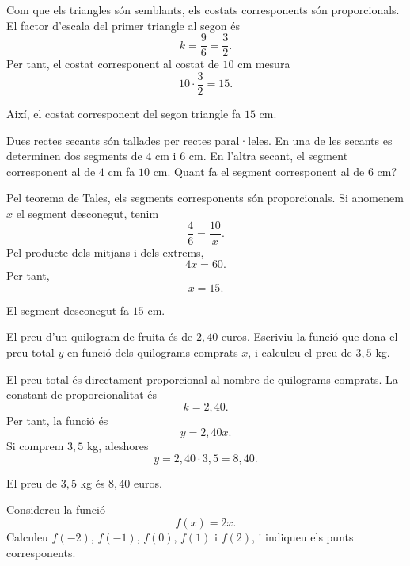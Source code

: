 \begin{solucio}
	Com que els triangles són semblants, els costats corresponents són proporcionals. El factor d'escala del primer triangle al segon és
	\[
		k=\frac{9}{6}=\frac{3}{2}.
	\]
	Per tant, el costat corresponent al costat de \(10\) cm mesura
	\[
		10\cdot\frac{3}{2}=15.
	\]

	Així, el costat corresponent del segon triangle fa \(15\) cm.
\end{solucio}

\begin{exercici}
	Dues rectes secants són tallades per rectes paral·leles. En una de les secants es determinen dos segments de \(4\) cm i \(6\) cm. En l'altra secant, el segment corresponent al de \(4\) cm fa \(10\) cm. Quant fa el segment corresponent al de \(6\) cm?
\end{exercici}

\begin{solucio}
	Pel teorema de Tales, els segments corresponents són proporcionals. Si anomenem \(x\) el segment desconegut, tenim
	\[
		\frac{4}{6}
		=
		\frac{10}{x}.
	\]
	Pel producte dels mitjans i dels extrems,
	\[
		4x=60.
	\]
	Per tant,
	\[
		x=15.
	\]

	El segment desconegut fa \(15\) cm.
\end{solucio}

\begin{exercici}
	El preu d'un quilogram de fruita és de \(2{,}40\) euros. Escriviu la funció que dona el preu total \(y\) en funció dels quilograms comprats \(x\), i calculeu el preu de \(3{,}5\) kg.
\end{exercici}

\begin{solucio}
	El preu total és directament proporcional al nombre de quilograms comprats. La constant de proporcionalitat és
	\[
		k=2{,}40.
	\]
	Per tant, la funció és
	\[
		y=2{,}40x.
	\]
	Si comprem \(3{,}5\) kg, aleshores
	\[
		y=2{,}40\cdot3{,}5=8{,}40.
	\]

	El preu de \(3{,}5\) kg és \(8{,}40\) euros.
\end{solucio}

\begin{exercici}
	Considereu la funció
	\[
		f(x)=2x.
	\]
	Calculeu \(f(-2)\), \(f(-1)\), \(f(0)\), \(f(1)\) i \(f(2)\), i indiqueu els punts corresponents.
\end{exercici}

